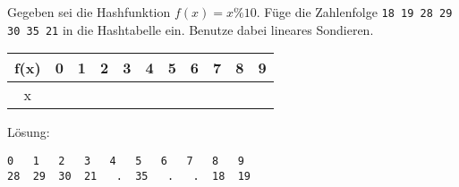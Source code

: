 
\renewcommand{\arraystretch}{2.0}
\setlength{\tabcolsep}{14pt}
\question[2]
Gegeben sei die Hashfunktion $f(x) = x \% 10$.
Füge die Zahlenfolge
\texttt{18 19 28 29 30 35 21}  in die Hashtabelle ein.
Benutze dabei lineares Sondieren.

\begin{tabular}{|c|c|c|c|c|c|c|c|c|c|c|}
\hline f(x) & 0 & 1 & 2 & 3 & 4 & 5 & 6 & 7 & 8 & 9 \\
\hline x     &   &    &    &   &   &    &    &   &   & \\
\hline
\end{tabular}

\ifprintanswers
Lösung:
\begin{lstlisting}
0   1   2   3   4   5   6   7   8   9
28  29  30  21   .  35   .   .  18  19
\end{lstlisting}
\fi
